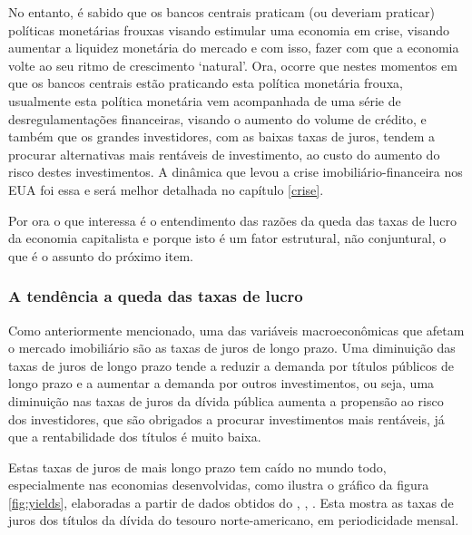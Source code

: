 \documentclass[
	12pt,				%
	oneside,			%
	a4paper,			%
	chapter=TITLE,		%
	section=TITLE,		%
	english,			%
	brazil				%
	]{abntex2}
\begin{document}
No entanto, é sabido que os bancos centrais praticam (ou deveriam praticar)
políticas monetárias frouxas visando estimular uma economia em crise, visando
aumentar a liquidez monetária do mercado e com isso, fazer com que a economia
volte ao seu ritmo de crescimento `natural'. Ora, ocorre que nestes momentos em
que os bancos centrais estão praticando esta política monetária frouxa,
usualmente esta política monetária vem acompanhada de uma série de
desregulamentações financeiras, visando o aumento do volume de crédito, e também
que os grandes investidores, com as baixas taxas de juros, tendem a procurar
alternativas mais rentáveis de investimento, ao custo do aumento do risco destes
investimentos. A dinâmica que levou a crise imobiliário-financeira nos EUA foi
essa e será melhor detalhada no capítulo \ref{crise}.

Por ora o que interessa é o entendimento das razões da queda das taxas de lucro
da economia capitalista e porque isto é um fator estrutural, não conjuntural, o
que é o assunto do próximo item.

\hypertarget{a-tenduxeancia-a-queda-das-taxas-de-lucro}{%
\subsubsection{A tendência a queda das taxas de lucro}\label{a-tenduxeancia-a-queda-das-taxas-de-lucro}}

Como anteriormente mencionado, uma das variáveis macroeconômicas que afetam o
mercado imobiliário são as taxas de juros de longo prazo. Uma diminuição das
taxas de juros de longo prazo tende a reduzir a demanda por títulos públicos de
longo prazo e a aumentar a demanda por outros investimentos, ou seja, uma
diminuição nas taxas de juros da dívida pública aumenta a propensão ao risco dos
investidores, que são obrigados a procurar investimentos mais rentáveis, já que
a rentabilidade dos títulos é muito baixa.

Estas taxas de juros de mais longo prazo tem caído no mundo todo, especialmente
nas economias desenvolvidas, como ilustra o gráfico da figura \ref{fig:yields},
elaboradas a partir de dados obtidos do \textcite{fredgs10}, \textcite{fredgs20}, \textcite{fredgs30}. Esta
mostra as taxas de juros dos títulos da dívida do tesouro norte-americano,
em periodicidade mensal.
\end{document}
